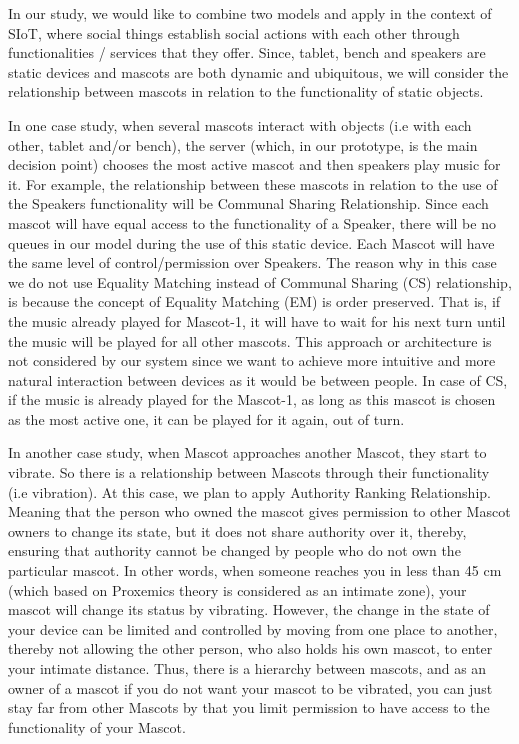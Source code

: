\par In our study, we would like to combine two models and apply in the context of SIoT, where social things establish social actions with each other through functionalities / services that they offer. Since, tablet, bench and speakers are static devices and mascots are both dynamic and ubiquitous, we will consider the relationship between mascots in relation to the functionality of static objects.
\par In one case study, when several mascots interact with objects (i.e with each other, tablet and/or bench), the server (which, in our prototype, is the main decision point) chooses the most active mascot and then speakers play music for it. For example, the relationship between these mascots in relation to the use of the Speakers functionality will be Communal Sharing Relationship. Since each mascot will have equal access to the functionality of a Speaker, there will be no queues in our model during the use of this static device. Each Mascot will have the same level of control/permission over Speakers. The reason why in this case we do not use Equality Matching instead of Communal Sharing (CS) relationship, is because the concept of Equality Matching (EM) is order preserved. That is, if the music already played for Mascot-1, it will have to wait for his next turn until the music will be played for all other mascots. This approach or architecture is not considered by our system since we want to achieve more intuitive and more natural interaction between devices as it would be between people. In case of CS, if the music is already played for the Mascot-1, as long as this mascot is chosen as the most active one, it can be played for it again, out of turn.
\par In another case study, when Mascot approaches another Mascot, they start to vibrate. So there is a relationship between Mascots through their functionality (i.e vibration). At this case, we plan to apply Authority Ranking Relationship. Meaning that the person who owned the mascot gives permission to other Mascot owners to change its state, but it does not share authority over it, thereby, ensuring that authority cannot be changed by people who do not own the particular mascot. In other words, when someone reaches you in less than 45 cm (which based on Proxemics theory is considered as an intimate zone), your mascot will change its status by vibrating. However, the change in the state of your device can be limited and controlled by moving from one place to another, thereby not allowing the other person, who also holds his own mascot, to enter your intimate distance. Thus, there is a hierarchy between mascots, and as an owner of a mascot if you do not want your mascot to be vibrated, you can just stay far from other Mascots by that you limit permission to have access to the functionality of your Mascot.

